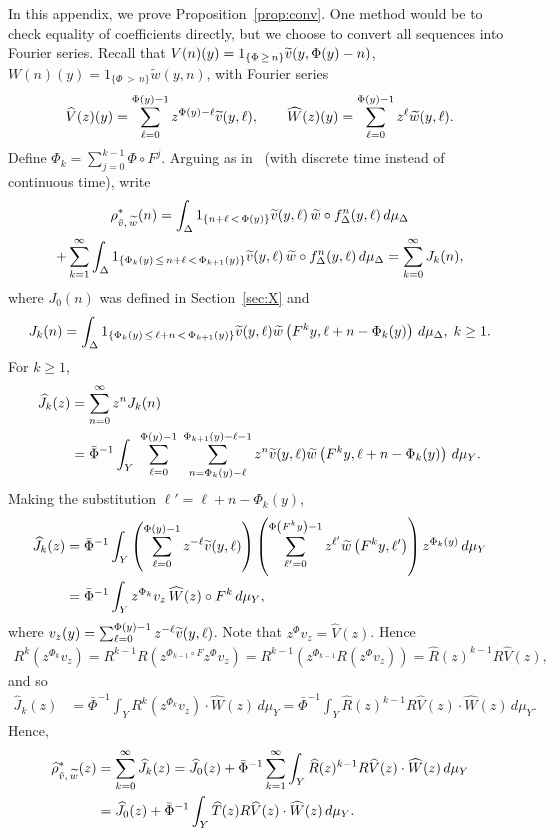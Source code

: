 \documentclass[AHL,Unicode,longabstracts,published]{cedram}
\newcommand{\hJ}{\widehat{J}}
\newcommand{\hR}{\widehat{R}}
\newcommand{\hT}{\widehat{T}}
\newcommand{\hV}{\widehat{V}}
\newcommand{\hW}{\widehat{W}}
\newcommand{\tw}{\widetilde{w}}
\newcommand{\tv}{\tilde{v}}
\newcommand{\bPhi}{\bar{\Phi}}
\let\oldtilde\tilde
\renewcommand*{\tilde}[1]{\mathchoice{\widetilde{#1}}{\widetilde{#1}}{\oldtilde{#1}}{\oldtilde{#1}}}
\let\oldhat\hat
\renewcommand*{\hat}[1]{\mathchoice{\widehat{#1}}{\widehat{#1}}{\oldhat{#1}}{\oldhat{#1}}}
\begin{document}
In this appendix, we prove Proposition~\ref{prop:conv}. One method would be to check equality of coefficients directly, but we choose to convert all sequences into Fourier series. Recall that $V(n)(y)=1_{\{\Phi\,\ge\,n\}}\tv(y,\Phi(y)-n)$, $W(n)(y)= 1_{\{\Phi\,>\,n\}}\tw(y,n)$, with Fourier series
\[
\hV(z)(y)=\sum_{\ell=0}^{\Phi(y)-1} z^{\Phi(y)-\ell}\tv(y,\ell), \qquad
\hW(z)(y)=\sum_{\ell=0}^{\Phi(y)-1} z^\ell\tw(y,\ell).
\]
Define $\Phi_k=\sum_{j=0}^{k-1}\Phi\circ F^j$. Arguing as in~\cite[Section~6.2]{M18} (with discrete time instead of continuous time), write
\begin{multline*}
\rho^*_{\tv,\,\tw}(n)  =\int_\Delta 1_{\left\{n+\ell\,<\,\Phi(y)\right\}}\tv(y,\ell)\,\tw\circ f_\Delta^n(y,\ell)\,d\mu_\Delta
\\ +\sum_{k=1}^\infty\int_\Delta 1_{\left\{\Phi_k(y)\,\le\,n+\ell\,<\,\Phi_{k+1}(y)\right\}}\tv(y,\ell)\,\tw\circ f_\Delta^n(y,\ell)\,d\mu_\Delta = \sum_{k=0}^\infty J_k(n),
\end{multline*}
where $J_0(n)$ was defined in Section~\ref{sec:X} and
\[
J_k(n)=
\int_\Delta 1_{\left\{\Phi_k(y)\,\le\,\ell+n\,<\,\Phi_{k+1}(y)\right\}}\tv(y,\ell)\tw\left(F^k y,\ell+n-\Phi_k(y)\right)\,d\mu_\Delta,\; k\ge1.
\]
For $k\ge1$,
\begin{align*}
\hJ_k(z) & =\sum_{n=0}^\infty z^nJ_k(n)\\
&=\bPhi^{-1}\int_Y\;\sum_{\ell=0}^{\Phi(y)-1}\;\sum_{n=\Phi_k(y)-\ell}^{\Phi_{k+1}(y)-\ell-1}z^n\tv(y,\ell)\tw\left(F^k y,\ell+n-\Phi_k(y)\right)\,d\mu_Y.
\end{align*}
Making the substitution $\ell'=\ell+n-\Phi_k(y)$,
\begin{align*}
\hJ_k(z) & =\bPhi^{-1}\int_Y\left(\sum_{\ell=0}^{\Phi(y)-1}z^{-\ell}\tv(y,\ell)\right)
\left(\sum_{\ell'=0}^{\Phi\left(F^k y\right)-1}z^{\ell'}\tw\left(F^k y,\ell'\right)\right)z^{\Phi_k(y)}\,d\mu_Y
\\ & = \bPhi^{-1}\int_Y z^{\Phi_k}v_z \,\hW(z)\circ F^k\,d\mu_Y,
\end{align*}
where $v_z(y)=\sum_{\ell=0}^{\Phi(y)-1}z^{-\ell}\tv(y,\ell)$. Note that $z^{\Phi}v_z=\hV(z)$. Hence
\begin{align*}
R^k\left(z^{\Phi_k}v_z\right)=R^{k-1}R\left(z^{\Phi_{k-1}\circ F}z^{\Phi}v_z\right) =R^{k-1}\left(z^{\Phi_{k-1}}R\left(z^{\Phi}v_z\right)\right) =\hR(z)^{k-1}R\hV(z),
\end{align*}
and so
\begin{align*}
\hJ_k(z) & = \bPhi^{-1}\int_Y R^k\left(z^{\Phi_k}v_z\right) \cdot \hW(z)\,d\mu_Y = \bPhi^{-1}\int_Y \hR(z)^{k-1}R\hV(z) \cdot \hW(z)\,d\mu_Y.
\end{align*}
Hence,
\begin{align*}
\hat\rho^*_{\tv,\,\tw}(z) & = \sum_{k=0}^\infty \hJ_k(z) =\hJ_0(z)+\bPhi^{-1}\sum_{k=1}^\infty \int_Y \hR(z)^{k-1}R\hV(z)\cdot \hW(z)\,d\mu_Y
\\ & =\hJ_0(z)+\bPhi^{-1}\int_Y \hT(z)R\hV(z)\cdot \hW(z)\,d\mu_Y.
\end{align*}
\end{document}
